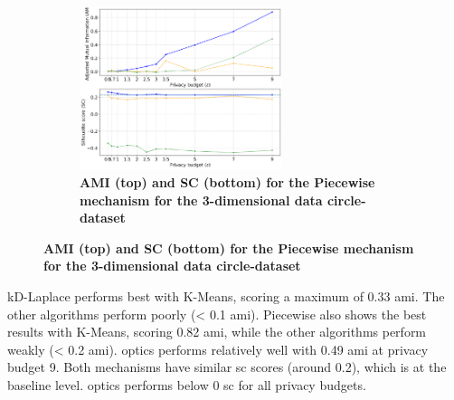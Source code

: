 \begin{figure}[H]
\begin{subfigure}{1\textwidth}
            \caption{\textbf{AMI (top) and SC (bottom) for the Piecewise mechanism for the 3-dimensional data circle-dataset}}
            \centering
            \includegraphics[width=0.65\textwidth]{Results/kd-laplace/piecewise/circle-dataset/ami-and-sc_3_dimensions.png}
      \end{subfigure}
      \label{fig:validation-circle-dataset_comparison_3d-laplace}
\end{figure}
kD-Laplace performs best with K-Means, scoring a maximum of 0.33 \gls{ami}. The other algorithms perform poorly (< 0.1 \gls{ami}).
Piecewise also shows the best results with K-Means, scoring 0.82 \gls{ami}, while the other algorithms perform weakly (< 0.2 \gls{ami}).
\gls{optics} performs relatively well with 0.49 \gls{ami} at privacy budget 9.
Both mechanisms have similar \gls{sc} scores (around 0.2), which is at the baseline level.
\gls{optics} performs below 0 \gls{sc} for all privacy budgets.
\newpage

